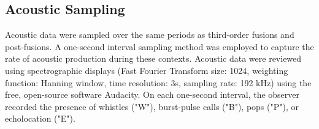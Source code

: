 \documentclass[11pt]{amsart}
\begin{document}
%
%
%

\subsection{Acoustic Sampling}
Acoustic data were sampled over the same periods as third-order fusions and post-fusions. A one-second interval sampling method was employed to capture the rate of acoustic production during these contexts. Acoustic data were reviewed using spectrographic displays (Fast Fourier Transform size: 1024, weighting function: Hanning window, time resolution: 3s, sampling rate: 192 kHz) using the free, open-source software Audacity. On each one-second interval, the observer recorded the presence of whistles ("W"), burst-pulse calls ("B"), pops ("P"), or echolocation ("E"). 



\end{document}
